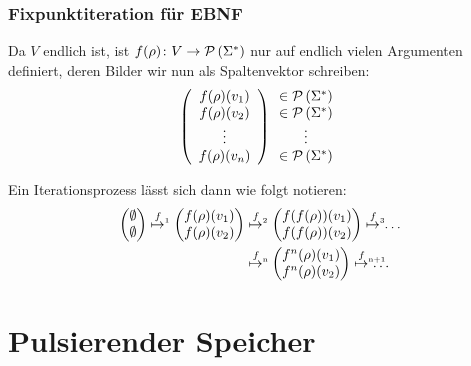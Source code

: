 \documentclass{beamer}
\newcommand{\ghost}[1]{\raisebox{0pt}[0pt][0pt]{\makebox[0pt][l]{#1}}}
\begin{document}
\begin{frame} \frametitle{Fixpunktiteration für EBNF}
	Da $V$ endlich ist, ist $f(\rho) \colon V \to \mathcal{P}\left( \Sigma^\ast \right)$ nur auf endlich vielen Argumenten definiert, deren Bilder wir nun als Spaltenvektor schreiben:
	\begin{equation*}
		\left(
		\begin{array}{c}
			f(\rho)(v_1) \\
			f(\rho)(v_2) \\
			\vdots \\
			f(\rho)(v_n)
		\end{array}
		\right)
		\begin{array}{c}
			\in \mathcal{P}\left( \Sigma^\ast \right) \\
			\in \mathcal{P}\left( \Sigma^\ast \right) \\
			\vdots \\
			\in \mathcal{P}\left( \Sigma^\ast \right)
		\end{array}
	\end{equation*}
	
	\pause
	Ein Iterationsprozess lässt sich dann wie folgt notieren:
	\begin{align*}
		\begin{pmatrix} \emptyset \\ \emptyset \end{pmatrix}
		\overset{f}{\mapsto^{\ghost{\tiny 1}}} \
		\begin{pmatrix} f(\rho)(v_1) \\ f(\rho)(v_2) \end{pmatrix}
		&\overset{f}{\mapsto^{\ghost{\tiny 2}}} \
		\begin{pmatrix} f(f(\rho))(v_1) \\ f(f(\rho))(v_2) \end{pmatrix}
		\overset{f}{\mapsto^{\ghost{\tiny 3}}}
		\dots \\
		&\overset{f}{\mapsto^{\ghost{\tiny n}}} \
		\begin{pmatrix} f^n(\rho)(v_1) \\ f^n(\rho)(v_2) \end{pmatrix}
		\overset{f}{\mapsto^{\ghost{\tiny n+1}}}
		\dots
	\end{align*}
\end{frame}


\section{Pulsierender Speicher}
\end{document}
